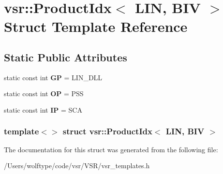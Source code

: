 \hypertarget{structvsr_1_1_product_idx_3_01_l_i_n_00_01_b_i_v_01_4}{\section{vsr\-:\-:Product\-Idx$<$ L\-I\-N, B\-I\-V $>$ Struct Template Reference}
\label{structvsr_1_1_product_idx_3_01_l_i_n_00_01_b_i_v_01_4}
}
\subsection*{Static Public Attributes}
\begin{DoxyCompactItemize}
\item 
\hypertarget{structvsr_1_1_product_idx_3_01_l_i_n_00_01_b_i_v_01_4_aa72ef56cc5a1e0db04794a2f479289e2}{static const int {\bfseries G\-P} = L\-I\-N\-\_\-\-D\-L\-L}\label{structvsr_1_1_product_idx_3_01_l_i_n_00_01_b_i_v_01_4_aa72ef56cc5a1e0db04794a2f479289e2}

\item 
\hypertarget{structvsr_1_1_product_idx_3_01_l_i_n_00_01_b_i_v_01_4_ae752798feebf47864f3135a01ab93e85}{static const int {\bfseries O\-P} = P\-S\-S}\label{structvsr_1_1_product_idx_3_01_l_i_n_00_01_b_i_v_01_4_ae752798feebf47864f3135a01ab93e85}

\item 
\hypertarget{structvsr_1_1_product_idx_3_01_l_i_n_00_01_b_i_v_01_4_aaacf11b5d5e994d6eb631a91cff2a4f8}{static const int {\bfseries I\-P} = S\-C\-A}\label{structvsr_1_1_product_idx_3_01_l_i_n_00_01_b_i_v_01_4_aaacf11b5d5e994d6eb631a91cff2a4f8}

\end{DoxyCompactItemize}
\subsubsection*{template$<$$>$ struct vsr\-::\-Product\-Idx$<$ L\-I\-N, B\-I\-V $>$}



The documentation for this struct was generated from the following file\-:\begin{DoxyCompactItemize}
\item 
/\-Users/wolftype/code/vsr/\-V\-S\-R/vsr\-\_\-templates.\-h\end{DoxyCompactItemize}
